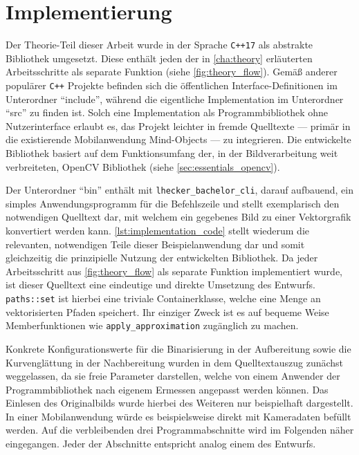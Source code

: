 \chapter{Implementierung}%
\label{cha:implementation}

Der Theorie-Teil dieser Arbeit wurde in der Sprache \texttt{C++17} als abstrakte Bibliothek umgesetzt.
Diese enthält jeden der in \autoref{cha:theory} erläuterten Arbeitsschritte als separate Funktion (siehe \autoref{fig:theory_flow}).
Gemäß anderer populärer \texttt{C++} Projekte befinden sich die öffentlichen Interface-Definitionen im Unterordner \enquote{include}, während die eigentliche Implementation im Unterordner \enquote{src} zu finden ist.
Solch eine Implementation als Programmbibliothek ohne Nutzerinterface erlaubt es, das Projekt leichter in fremde Quelltexte --- primär in die existierende Mobilanwendung Mind-Objects --- zu integrieren.
Die entwickelte Bibliothek basiert auf dem Funktionsumfang der, in der Bildverarbeitung weit verbreiteten, OpenCV Bibliothek (siehe \autoref{sec:essentials_opencv}).

Der Unterordner \enquote{bin} enthält mit \texttt{lhecker\_bachelor\_cli}, darauf aufbauend, ein simples Anwendungsprogramm für die Befehlszeile und stellt exemplarisch den notwendigen Quelltext dar, mit welchem ein gegebenes Bild zu einer Vektorgrafik konvertiert werden kann.
\autoref{lst:implementation_code} stellt wiederum die relevanten, notwendigen Teile dieser Beispielanwendung dar und somit gleichzeitig die prinzipielle Nutzung der entwickelten Bibliothek.
Da jeder Arbeitsschritt aus \autoref{fig:theory_flow} als separate Funktion implementiert wurde, ist dieser Quelltext eine eindeutige und direkte Umsetzung des Entwurfs.
\texttt{paths::set} ist hierbei eine triviale Containerklasse, welche eine Menge an vektorisierten Pfaden speichert.
Ihr einziger Zweck ist es auf bequeme Weise Memberfunktionen wie \texttt{apply\_approximation} zugänglich zu machen.

Konkrete Konfigurationswerte für die Binarisierung in der Aufbereitung sowie die Kurvenglättung in der Nachbereitung wurden in dem Quelltextauszug zunächst weggelassen, da sie freie Parameter darstellen, welche von einem Anwender der Programmbibliothek nach eigenem Ermessen angepasst werden können.
Das Einlesen des Originalbilds wurde hierbei des Weiteren nur beispielhaft dargestellt.
In einer Mobilanwendung würde es beispielsweise direkt mit Kameradaten befüllt werden.
Auf die verbleibenden drei Programmabschnitte wird im Folgenden näher eingegangen.
Jeder der Abschnitte entspricht analog einem des Entwurfs.

